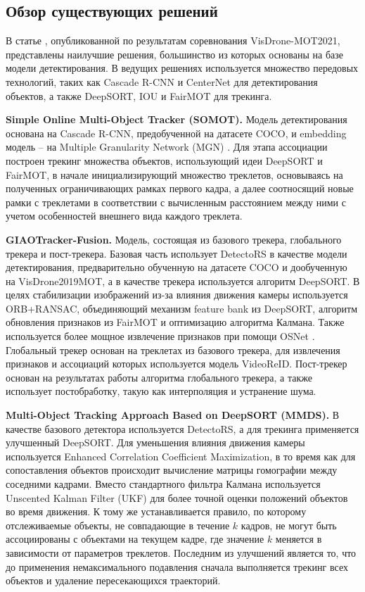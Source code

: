 \subsection{Обзор существующих решений}

В статье \cite{14-1}, опубликованной по результатам соревнования VisDrone-MOT2021, представлены наилучшие решения, большинство из которых основаны на базе модели детектирования. В ведущих решениях используется множество передовых технологий, таких как Cascade R-CNN и CenterNet для детектирования объектов, а также DeepSORT, IOU и FairMOT для трекинга.

\textbf{Simple Online Multi-Object Tracker (SOMOT).} Модель детектирования основана на Cascade R-CNN, предобученной на датасете COCO, и embedding модель -- на Multiple Granularity Network (MGN) \cite{14-2}. Для этапа ассоциации построен трекинг множества объектов, использующий идеи DeepSORT и FairMOT, в начале инициализирующий множество треклетов, основываясь на полученных ограничивающих рамках первого кадра, а далее соотносящий новые рамки с треклетами в соответствии с вычисленным расстоянием между ними с учетом особенностей внешнего вида каждого треклета.

\textbf{GIAOTracker-Fusion.} Модель, состоящая из базового трекера, глобального трекера и пост-трекера. Базовая часть использует DetectoRS \cite{14-3} в качестве модели детектирования, предварительно обученную на датасете COCO и дообученную на VisDrone2019MOT, а в качестве трекера используется алгоритм DeepSORT. В целях стабилизации изображений из-за влияния движения камеры используется ORB+RANSAC, объединяющий механизм feature bank из DeepSORT, алгоритм обновления признаков из FairMOT и оптимизацию алгоритма Калмана. Также используется более мощное извлечение признаков при помощи OSNet \cite{14-4}. Глобальный трекер основан на треклетах из базового трекера, для извлечения признаков и ассоциаций которых используется модель VideoReID. Пост-трекер основан на результатах работы алгоритма глобального трекера, а также использует постобработку, такую как интерполяция и устранение шума.

\textbf{Multi-Object Tracking Approach Based on DeepSORT (MMDS).} В качестве базового детектора используется DetectoRS, а для трекинга применяется улучшенный DeepSORT. Для уменьшения влияния движения камеры используется Enhanced Correlation Coefficient Maximization, в то время как для сопоставления объектов происходит вычисление матрицы гомографии между соседними кадрами. Вместо стандартного фильтра Калмана используется Unscented Kalman Filter (UKF) для более точной оценки положений объектов во время движения. К тому же устанавливается правило, по которому отслеживаемые объекты, не совпадающие в течение $k$ кадров, не могут быть ассоциированы с объектами на текущем кадре, где значение $k$ меняется в зависимости от параметров треклетов. Последним из улучшений является то, что до применения немаксимального подавления сначала выполняется трекинг всех объектов и удаление пересекающихся траекторий.


